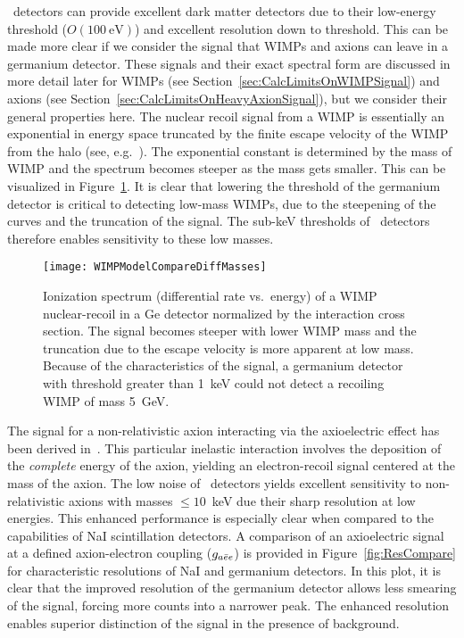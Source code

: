 	\ppc~detectors can provide excellent dark matter detectors due to their low-energy threshold ($O(100~\text{eV})$) and excellent resolution down to threshold.  This can be made more clear if we consider the signal that WIMPs and axions can leave in a germanium detector.  These signals and their exact spectral form are discussed in more detail later for WIMPs (see Section~\ref{sec:CalcLimitsOnWIMPSignal}) and axions (see Section~\ref{sec:CalcLimitsOnHeavyAxionSignal}), but we consider their general properties here.  The nuclear recoil signal from a WIMP is essentially an exponential in energy space truncated by the finite escape velocity of the WIMP from the halo (see, e.g.~\cite{Jun96, Lew96}).  The exponential constant is determined by the mass of WIMP and the spectrum becomes steeper as the mass gets smaller.  This can be visualized in Figure~\ref{fig:WIMPDiffMasses}.  It is clear that lowering the threshold of the germanium detector is critical to detecting low-mass WIMPs, due to the steepening of the curves and the truncation of the signal.  The sub-keV thresholds of \ppc~detectors therefore enables sensitivity to these low masses.
	
			\begin{figure}
				\centering
				\texttt{[image: WIMPModelCompareDiffMasses]}
				\caption[Ionization spectrum of a WIMP nuclear-recoil in a Ge detector.]
				{Ionization spectrum (differential rate vs.~energy) of a WIMP nuclear-recoil in a Ge detector normalized by the
				 interaction cross section.  The signal becomes steeper with lower WIMP mass and the truncation due to the
				 escape velocity is more apparent at low mass.  Because of the characteristics of the signal, a germanium
				  detector with threshold greater than 1~keV could not detect a recoiling WIMP of mass 5~GeV.}
				\label{fig:WIMPDiffMasses}
			\end{figure}


	The signal for a non-relativistic axion interacting via the axioelectric effect has been derived in~\cite{Pospelov:2008jk}.  This particular inelastic interaction involves the deposition of the \emph{complete} energy of the axion, yielding an electron-recoil signal centered at the mass of the axion.  The low noise of \ppc~detectors yields excellent sensitivity to non-relativistic axions with masses $\leq10$~keV due their sharp resolution at low energies.  This enhanced performance is especially clear when compared to the capabilities of NaI scintillation detectors.  A comparison of an axioelectric signal at a defined axion-electron coupling ($g_{a\bar{e}e}$) is provided in Figure~\ref{fig:ResCompare} for characteristic resolutions of NaI and germanium detectors.  In this plot, it is clear that the improved resolution of the germanium detector allows less smearing of the signal, forcing more counts into a narrower peak.  The enhanced resolution enables superior distinction of the signal in the presence of background.
	
